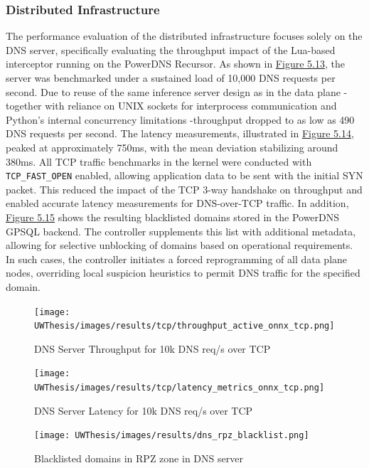 \documentclass [11pt, proquest] {uwthesis}[2020/02/24]
\begin{document}
\subsubsection{Distributed Infrastructure}
The performance evaluation of the distributed infrastructure focuses solely on the DNS server, specifically evaluating the throughput impact of the Lua-based interceptor running on the PowerDNS Recursor. As shown in \hyperref[fig:throughput_gsld_tcp]{Figure 5.13}, the server was benchmarked under a sustained load of 10,000 DNS requests per second. Due to reuse of the same inference server design as in the data plane - together with reliance on UNIX sockets for interprocess communication and Python’s internal concurrency limitations -throughput dropped to as low as 490 DNS requests per second. The latency measurements, illustrated in \hyperref[fig:throughput_onnx_tcp]{Figure 5.14}, peaked at approximately 750ms, with the mean deviation stabilizing around 380ms.
All TCP traffic benchmarks in the kernel were conducted with \texttt{TCP\_FAST\_OPEN} enabled, allowing application data to be sent with the initial SYN packet. This reduced the impact of the TCP 3-way handshake on throughput and enabled accurate latency measurements for DNS-over-TCP traffic.
In addition, \hyperref[fig:dns_rpz]{Figure 5.15} shows the resulting blacklisted domains stored in the PowerDNS GPSQL backend. The controller supplements this list with additional metadata, allowing for selective unblocking of domains based on operational requirements. In such cases, the controller initiates a forced reprogramming of all data plane nodes, overriding local suspicion heuristics to permit DNS traffic for the specified domain.



\begin{figure}[H]
  \centering
  \texttt{[image: UWThesis/images/results/tcp/throughput\_active\_onnx\_tcp.png]}
  \caption{DNS Server Throughput for 10k DNS req/s over TCP}
  \label{fig:throughput_gsld_tcp}
\end{figure}

\begin{figure}[H]
  \centering
  \texttt{[image: UWThesis/images/results/tcp/latency\_metrics\_onnx\_tcp.png]}
  \caption{DNS Server Latency for 10k DNS req/s over TCP}
  \label{fig:throughput_onnx_tcp}
\end{figure}



\begin{figure}[H]
  \texttt{[image: UWThesis/images/results/dns\_rpz\_blacklist.png]}
\caption{Blacklisted domains in RPZ zone in DNS server}
  \label{fig:dns_rpz}
\end{figure}
\end{document}
